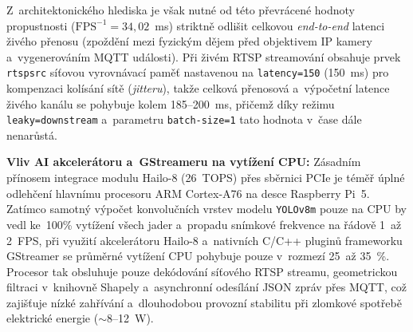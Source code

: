 Z~architektonického hlediska je však nutné od této převrácené hodnoty propustnosti ($\text{FPS}^{-1} = 34{,}02$~ms) striktně odlišit celkovou \textit{end-to-end} latenci živého přenosu (zpoždění mezi fyzickým dějem před objektivem \acs{IP} kamery a~vygenerováním MQTT události). Při živém RTSP streamování obsahuje prvek \texttt{rtspsrc} síťovou vyrovnávací paměť nastavenou na \texttt{latency=150} (150~ms) pro kompenzaci kolísání sítě (\textit{jitteru}), takže celková přenosová a~výpočetní latence živého kanálu se pohybuje kolem 185--200~ms, přičemž díky režimu \texttt{leaky=downstream} a~parametru \texttt{batch-size=1} tato hodnota v~čase dále nenarůstá.

\textbf{Vliv AI akcelerátoru a~GStreameru na vytížení CPU:} Zásadním přínosem integrace modulu Hailo-8 (26~TOPS) přes sběrnici \acs{PCIe} je téměř úplné odlehčení hlavnímu procesoru \acs{ARM} Cortex-A76 na desce Raspberry Pi~5. Zatímco samotný výpočet konvolučních vrstev modelu \texttt{YOLOv8m} pouze na CPU by vedl ke~100\% vytížení všech jader a~propadu snímkové frekvence na řádově 1~až 2~FPS, při využití akcelerátoru Hailo-8 a~nativních C/C++ pluginů frameworku GStreamer se průměrné vytížení CPU pohybuje pouze v~rozmezí 25~až 35~\%. Procesor tak obsluhuje pouze dekódování síťového RTSP streamu, geometrickou filtraci v~knihovně Shapely a~asynchronní odesílání JSON zpráv přes MQTT, což zajišťuje nízké zahřívání a~dlouhodobou provozní stabilitu při zlomkové spotřebě elektrické energie ($\sim$8--12~W).
